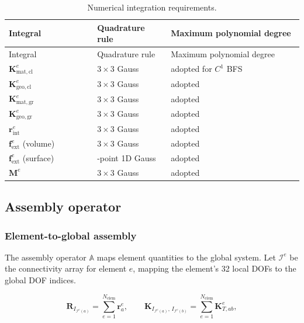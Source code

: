 \documentclass[11pt]{article}
\begin{document}
\begin{longtable}[c]{>{\raggedright\arraybackslash}p{0.30\linewidth}
>{\raggedright\arraybackslash}p{0.25\linewidth}
>{\raggedright\arraybackslash}p{0.45\linewidth}}
\caption{Numerical integration requirements.}
\label{tab:integration}\\
\toprule
Integral & Quadrature rule & Maximum polynomial degree \\
\midrule
\endfirsthead
\toprule
Integral & Quadrature rule & Maximum polynomial degree \\
\midrule
\endhead
$\mathbf{K}_{\mathrm{mat,cl}}^{e}$ & $3\times 3$ Gauss & adopted for $C^{1}$ BFS \\
$\mathbf{K}_{\mathrm{geo,cl}}^{e}$ & $3\times 3$ Gauss & adopted \\
$\mathbf{K}_{\mathrm{mat,gr}}^{e}$ & $3\times 3$ Gauss & adopted \\
$\mathbf{K}_{\mathrm{geo,gr}}^{e}$ & $3\times 3$ Gauss & adopted \\
$\mathbf{r}_{\mathrm{int}}^{e}$ & $3\times 3$ Gauss & adopted \\
$\mathbf{f}_{\mathrm{ext}}^{e}$ (volume) & $3\times 3$ Gauss & adopted \\
$\mathbf{f}_{\mathrm{ext}}^{e}$ (surface) & 3-point 1D Gauss & adopted \\
$\mathbf{M}^{e}$ & $3\times 3$ Gauss & adopted \\
\bottomrule
\end{longtable}

\subsection{Assembly operator}
\label{ssec:assembly}

\subsubsection{Element-to-global assembly}

The assembly operator $\mathbb{A}$ maps element quantities to the
global system. Let $\mathcal{I}^{e}$ be the connectivity array for
element $e$, mapping the element's 32 local DOFs to the global DOF
indices.

\begin{equation}
\boxed{
\mathbf{R}_{I_{\mathcal{I}^{e}(a)}} = \sum_{e=1}^{N_{\mathrm{elem}}}
  \mathbf{r}^{e}_{a},
\qquad
\mathbf{K}_{I_{\mathcal{I}^{e}(a)},\,I_{\mathcal{I}^{e}(b)}}
= \sum_{e=1}^{N_{\mathrm{elem}}}
  \mathbf{K}_{T,a b}^{e},
}
\label{s7:assembly}
\end{equation}
\end{document}
